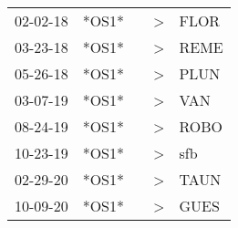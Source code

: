 \begin{supertabular}{p{0.07\textwidth}p{0.06\textwidth}p{0.02\textwidth}p{0.02\textwidth}p{0.06\textwidth}}
 02-02-18\textsuperscript{} &                   *OS1* &    &     \textgreater &           FLOR\textsuperscript{} \\
 03-23-18\textsuperscript{} &                   *OS1* &    &     \textgreater &           REME\textsuperscript{} \\
 05-26-18\textsuperscript{} &                   *OS1* &    &     \textgreater &           PLUN\textsuperscript{} \\
 03-07-19\textsuperscript{} &                   *OS1* &    &     \textgreater &            VAN\textsuperscript{} \\
 08-24-19\textsuperscript{} &                   *OS1* &    &     \textgreater &           ROBO\textsuperscript{} \\
 10-23-19\textsuperscript{} &                   *OS1* &    &     \textgreater &            sfb\textsuperscript{} \\
 02-29-20\textsuperscript{} &                   *OS1* &    &     \textgreater &           TAUN\textsuperscript{} \\
 10-09-20\textsuperscript{} &                   *OS1* &    &     \textgreater &           GUES\textsuperscript{} \\
\end{supertabular}

